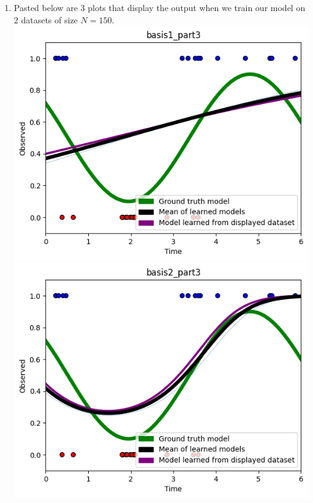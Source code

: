 \documentclass[submit]{harvardml}
\begin{document}
\begin{enumerate}
     \item
     Pasted below are 3 plots that display the output when we train our model on 2 datasets of size $N=150$. \\
     \includegraphics[scale = 0.25]{hw2/images/1.3_basis1.png}
     \includegraphics[scale = 0.25]{hw2/images/1.3_basis2.png}

\end{enumerate}
\end{document}
